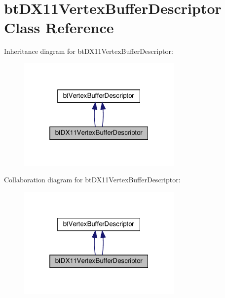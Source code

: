 \hypertarget{classbtDX11VertexBufferDescriptor}{}\section{bt\+D\+X11\+Vertex\+Buffer\+Descriptor Class Reference}
\label{classbtDX11VertexBufferDescriptor}


Inheritance diagram for bt\+D\+X11\+Vertex\+Buffer\+Descriptor\+:
\nopagebreak
\begin{figure}[H]
\begin{center}
\leavevmode
\includegraphics[width=229pt]{classbtDX11VertexBufferDescriptor__inherit__graph}
\end{center}
\end{figure}


Collaboration diagram for bt\+D\+X11\+Vertex\+Buffer\+Descriptor\+:
\nopagebreak
\begin{figure}[H]
\begin{center}
\leavevmode
\includegraphics[width=229pt]{classbtDX11VertexBufferDescriptor__coll__graph}
\end{center}
\end{figure}
